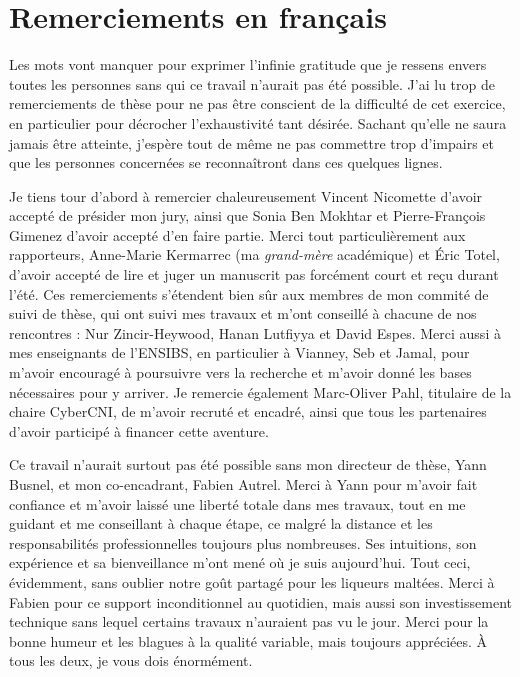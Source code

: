 \section{Remerciements en français\label{sec:french}}

Les mots vont manquer pour exprimer l'infinie gratitude que je ressens envers toutes les personnes sans qui ce travail n'aurait pas été possible.
J'ai lu trop de remerciements de thèse pour ne pas être conscient de la difficulté de cet exercice, en particulier pour décrocher l'exhaustivité tant désirée.
Sachant qu'elle ne saura jamais être atteinte, j'espère tout de même ne pas commettre trop d'impairs et que les personnes concernées se reconnaîtront dans ces quelques lignes.

Je tiens tour d'abord à remercier chaleureusement Vincent Nicomette d'avoir accepté de présider mon jury, ainsi que Sonia Ben Mokhtar et Pierre-François Gimenez d'avoir accepté d'en faire partie.
Merci tout particulièrement aux rapporteurs, Anne-Marie Kermarrec (ma \emph{grand-mère} académique) et Éric Totel, d'avoir accepté de lire et juger un manuscrit pas forcément court et reçu durant l'été.
Ces remerciements s'étendent bien sûr aux membres de mon commité de suivi de thèse, qui ont suivi mes travaux et m'ont conseillé à chacune de nos rencontres : Nur Zincir-Heywood, Hanan Lutfiyya et David Espes.
Merci aussi à mes enseignants de l'ENSIBS, en particulier à Vianney, Seb et Jamal, pour m'avoir encouragé à poursuivre vers la recherche et m'avoir donné les bases nécessaires pour y arriver.
Je remercie également Marc-Oliver Pahl, titulaire de la chaire CyberCNI, de m'avoir recruté et encadré, ainsi que tous les partenaires d'avoir participé à financer cette aventure.

Ce travail n'aurait surtout pas été possible sans mon directeur de thèse, Yann Busnel, et mon co-encadrant, Fabien Autrel. 
Merci à Yann pour m'avoir fait confiance et m'avoir laissé une liberté totale dans mes travaux, tout en me guidant et me conseillant à chaque étape, ce malgré la distance et les responsabilités professionnelles toujours plus nombreuses.
Ses intuitions, son expérience et sa bienveillance m'ont mené où je suis aujourd'hui.
Tout ceci, évidemment, sans oublier notre goût partagé pour les liqueurs maltées.
Merci à Fabien pour ce support inconditionnel au quotidien, mais aussi son investissement technique sans lequel certains travaux n'auraient pas vu le jour.
Merci pour la bonne humeur et les blagues à la qualité variable, mais toujours appréciées.
À tous les deux, je vous dois énormément.

